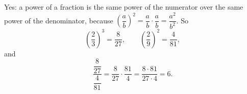 Yes: a power of a fraction is the same power of the numerator over the same power of the denominator, because $\left(\dfrac{a}{b}\right)^2=\dfrac{a}{b}\cdot\dfrac{a}{b}=\dfrac{a^2}{b^2}$. So
\[
\left(\dfrac{2}{3}\right)^3=\dfrac{8}{27},\qquad \left(\dfrac{2}{9}\right)^2=\dfrac{4}{81},
\]
and
\[
\dfrac{\dfrac{8}{27}}{\dfrac{4}{81}}=\dfrac{8}{27}\cdot\dfrac{81}{4}=\dfrac{8\cdot81}{27\cdot4}=\boxed{6}.
\]
